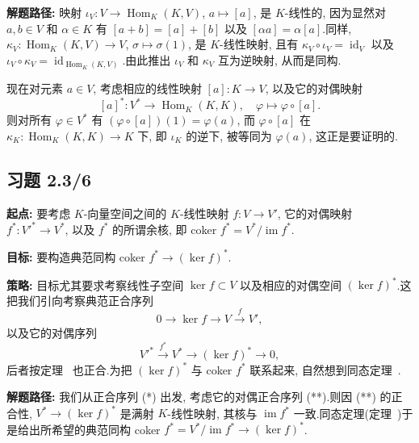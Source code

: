\noindent\textbf{解题路径:} 映射 $\iota_V \colon V \longrightarrow \operatorname{Hom}_K(K, V)$, $a \longmapsto [a]$, 是 $K$-线性的, 因为显然对 $a, b \in V$ 和 $\alpha \in K$ 有 $[a + b] = [a] + [b]$ 以及 $[\alpha a] = \alpha [a]$.同样, $\kappa_V \colon \operatorname{Hom}_K(K, V) \longrightarrow V$, $\sigma \longmapsto \sigma(1)$, 是 $K$-线性映射, 且有 $\kappa_V \circ \iota_V = \operatorname{id}_V$ 以及 $\iota_V \circ \kappa_V = \operatorname{id}_{\operatorname{Hom}_K(K, V)}$.由此推出 $\iota_V$ 和 $\kappa_V$ 互为逆映射, 从而是同构.

现在对元素 $a \in V$, 考虑相应的线性映射 $[a] \colon K \longrightarrow V$, 以及它的对偶映射
\[
[a]^* \colon V^* \longrightarrow \operatorname{Hom}_K(K, K), \quad \varphi \longmapsto \varphi \circ [a].
\]
则对所有 $\varphi \in V^*$ 有 $(\varphi \circ [a])(1) = \varphi(a)$, 而 $\varphi \circ [a]$ 在 $\kappa_K \colon \operatorname{Hom}_K(K, K) \longrightarrow K$ 下, 即 $\iota_K$ 的逆下, 被等同为 $\varphi(a)$, 这正是要证明的.

\subsection*{习题 2.3/6}

\noindent\textbf{起点:} 要考虑 $K$-向量空间之间的 $K$-线性映射 $f \colon V \longrightarrow V'$, 它的对偶映射 $f^* \colon V'^* \longrightarrow V^*$, 以及 $f^*$ 的所谓余核, 即 coker $f^* = V^*/\operatorname{im} f^*$.

\noindent\textbf{目标:} 要构造典范同构 coker $f^* \longrightarrow (\ker f)^*$.

\noindent\textbf{策略:} 目标尤其要求考察线性子空间 $\ker f \subset V$ 以及相应的对偶空间 $(\ker f)^*$.这把我们引向考察典范正合序列
\begin{equation}
0 \longrightarrow \ker f \longrightarrow V \xrightarrow{f} V', \tag{(*)}
\end{equation}
以及它的对偶序列
\begin{equation}
V'^* \xrightarrow{f^*} V^* \longrightarrow (\ker f)^* \longrightarrow 0, \tag{(**)}
\end{equation}
后者按定理~ 也正合.为把 $(\ker f)^*$ 与 coker $f^*$ 联系起来, 自然想到同态定理~.

\noindent\textbf{解题路径:} 我们从正合序列 (*) 出发, 考虑它的对偶正合序列 (**).则因 (**) 的正合性, $V^* \longrightarrow (\ker f)^*$ 是满射 $K$-线性映射, 其核与 $\operatorname{im} f^*$ 一致.同态定理(定理~)于是给出所希望的典范同构 coker $f^* = V^*/\operatorname{im} f^* \longrightarrow (\ker f)^*$.

